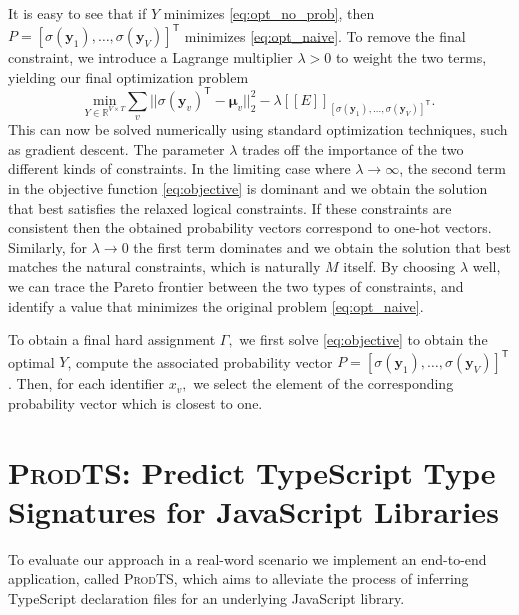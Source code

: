 \documentclass[sigplan,10pt,anonymous]{acmart} %
\newcommand{\qqpi}[2]{[\![#2]\!]_{#1}}
\newcommand{\prodts}{\textsc{ProdTS}\xspace}
\theoremstyle{plain}
\theoremstyle{remark}
\theoremstyle{definition}
\begin{document}
It is easy to see that if $Y$ minimizes \eqref{eq:opt_no_prob}, then
$P = [\sigma(\bm{y}_1), \ldots, \allowbreak \sigma(\bm{y}_{V})]^\mathsf{T}$
minimizes \eqref{eq:opt_naive}. To remove the final constraint,
we introduce a Lagrange multiplier $\lambda > 0$ to weight
the two terms, yielding our final optimization problem
\begin{equation}\label{eq:objective}
  \underset{Y \in \mathbb{R}^{V \times T}}{\mathrm{min}}
  \sum_v || \sigma(\bm{y}_v)^\mathsf{T} - \bm{\mu}_v ||_2^2
  - \lambda \qqpi{[\sigma(\bm{y}_1), \ldots, \sigma(\bm{y}_{V})]^\mathsf{T}}{E}.
\end{equation}
This can now be solved numerically using standard optimization
techniques, such as gradient descent.
The parameter $\lambda$ trades off the importance
of the two different kinds of constraints.
In the limiting case where $\lambda \rightarrow \infty$, the second term in the objective function \eqref{eq:objective} is dominant and we obtain the solution that best satisfies the relaxed
logical constraints.
If these constraints are consistent then the obtained probability vectors correspond to one-hot vectors.
Similarly, for $\lambda \rightarrow 0$ the first term dominates and we obtain the solution that best matches the natural constraints,
which is naturally $M$ itself. By choosing $\lambda$ well,
we can trace the Pareto frontier between the two types of constraints,
and identify a value that minimizes the original problem \eqref{eq:opt_naive}.

To obtain a final hard assignment $\Gamma,$ we first solve \eqref{eq:objective} to obtain the optimal $Y$, compute the
associated probability vector $P = [\sigma(\bm{y}_1), \ldots, \sigma(\bm{y}_{V})]^\mathsf{T}$. Then, for each identifier $x_v,$
we select the element of the
corresponding probability vector which is closest to one.

\section{\prodts: Predict TypeScript Type Signatures for JavaScript Libraries}
\label{sec:prodts}
To evaluate our approach in a real-word scenario we
implement an end-to-end application, called \prodts, which aims
to alleviate the process of inferring TypeScript declaration files
for an underlying JavaScript library.
\end{document}
